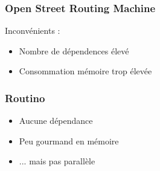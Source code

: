 \begin{frame}
\frametitle{Open Street Routing Machine}
Inconvénients :
\begin{itemize}
\item Nombre de dépendences élevé
    \vspace{1em}
\item Consommation mémoire trop élevée
\end{itemize}
\end{frame}


\begin{frame}
\frametitle{Routino}
\begin{itemize}
\item Aucune dépendance
    \vspace{1em}
\item Peu gourmand en mémoire
    \vspace{1em}
\item ... mais pas parallèle
\end{itemize}
\end{frame}

